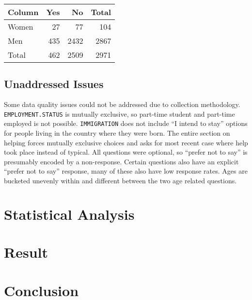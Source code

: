 \documentclass[journal,12pt,onecolumn,]{IEEEtran}
\begin{document}
\begin{tabular}{lrrr}
    \toprule
    Column & Yes & No   & Total \\
    \midrule
    Women  & 27  & 77   & 104   \\
    Men    & 435 & 2432 & 2867  \\
    Total  & 462 & 2509 & 2971  \\
    \bottomrule
\end{tabular}

\subsection{Unaddressed Issues}

Some data quality issues could not be addressed due to collection methodology.
\texttt{EMPLOYMENT.STATUS} is mutually exclusive, so part-time student and part-time employed is not possible.
\texttt{IMMIGRATION} does not include ``I intend to stay'' options for people living in the country where they were born.
The entire section on helping forces mutually exclusive choices and asks for most recent case where help took place instead of typical.
All questions were optional, so ``prefer not to say'' is presumably encoded by a non-response. Certain questions also have an explicit ``prefer not to say'' response, many of these also have low response rates.
Ages are bucketed unevenly within and different between the two age related questions.

\section{Statistical Analysis}

\section{Result}


\section{Conclusion}



\end{document}
